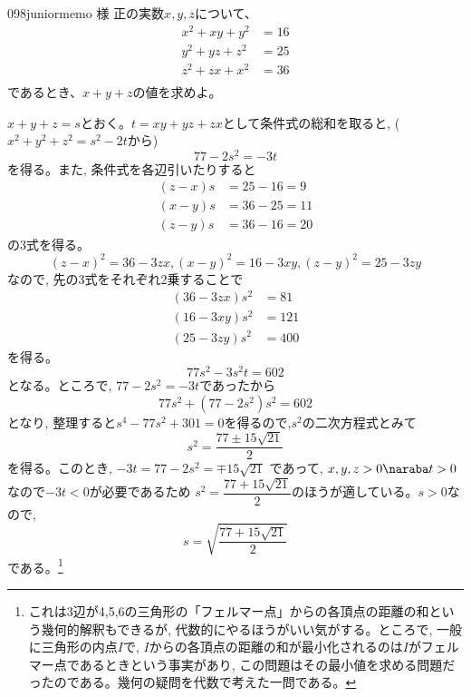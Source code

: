 \begin{thm}{098}{}{juniormemo 様}
 正の実数$x, y, z$について、
 \begin{align*}
  x^2+xy+y^2&=16 \\
  y^2+yz+z^2&=25 \\
  z^2+zx+x^2&=36 \\
 \end{align*}
 であるとき、$x+y+z$の値を求めよ。
\end{thm}

$x+y+z=s$とおく。$t=xy+yz+zx$として条件式の総和を取ると, ($x^2+y^2+z^2=s^2-2t$から)
\[77-2s^2=-3t\]
を得る。また, 条件式を各辺引いたりすると
\begin{align*}
 (z-x)s&=25-16=9 \\
 (x-y)s&=36-25=11 \\
 (z-y)s&=36-16=20
\end{align*}
の3式を得る。
\[(z-x)^2=36-3zx, (x-y)^2=16-3xy, (z-y)^2=25-3zy\]
なので, 先の3式をそれぞれ2乗することで
\begin{align*}
 (36-3zx)s^2&=81 \\
 (16-3xy)s^2&=121 \\
 (25-3zy)s^2&=400
\end{align*}
を得る。
\[77s^2-3s^2t=602\]
となる。ところで, $77-2s^2=-3t$であったから
\[77s^2+(77-2s^2)s^2=602\]
となり, 整理すると$s^4-77s^2+301=0$を得るので,$s^2$の二次方程式とみて
\[s^2=\dfrac{77\pm 15\sqrt{21}}{2}\]
を得る。このとき, $-3t=77-2s^2=\mp 15\sqrt{21}$ であって, $x,y,z>0\naraba t>0$なので$-3t<0$が必要であるため $s^2=\dfrac{77+15\sqrt{21}}{2}$のほうが適している。$s>0$なので, 
\[s=\sqrt{\dfrac{77+15\sqrt{21}}{2}}\]
である。\footnote{これは3辺が4,5,6の三角形の「フェルマー点」からの各頂点の距離の和という幾何的解釈もできるが, 代数的にやるほうがいい気がする。ところで, 一般に三角形の内点$I$で, $I$からの各頂点の距離の和が最小化されるのは$I$がフェルマー点であるときという事実があり, この問題はその最小値を求める問題だったのである。幾何の疑問を代数で考えた一問である。}

